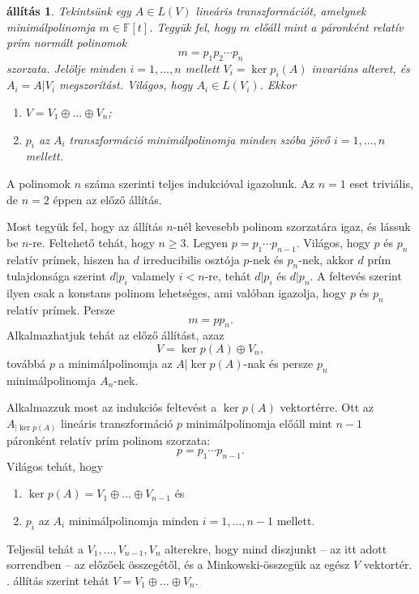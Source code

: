 \documentclass[9pt, a4paper, showtrims]{memoir}
\makeatletter
\let\Aref\relax
\renewenvironment{proof}[1][\proofname]
    {\par\pushQED{\qed}%
    \normalfont \topsep6\p@\@plus6\p@\relax
    \trivlist
    \item[\hskip\labelsep
        \itshape
    #1\@addpunct{:}]\ignorespaces}
    {\popQED\endtrivlist\@endpefalse}
\theoremstyle{plain}
\newtheorem{proposition}{állítás}[chapter]
\theoremstyle{remark}
\theoremstyle{definition}
\makeatother
\begin{document}
\begin{proposition}\label{pr:redukcio-primszorzat}
	Tekintsünk egy $A\in L\left( V \right)$ lineáris transzformációt,
	amelynek minimálpolinomja $m\in\mathbb{F}\left[ t \right]$.
	Tegyük fel, hogy $m$ előáll mint a páronként relatív prím
	normált polinomok
	\[
		m=p_1p_2\cdots p_n
	\]
	szorzata.
	Jelölje minden $i=1,\ldots,n$ mellett $V_i=\ker p_i\left( A \right)$
	invariáns alteret, és $A_i=A|V_i$ megszorítást.
	Világos, hogy $A_i\in L\left( V_i \right)$.
	Ekkor
	\begin{enumerate}
		\item $V=V_1\oplus\dots\oplus V_n$;
		\item $p_i$ az $A_i$ transzformáció minimálpolinomja minden szóba jövő
		      $i=1,\ldots,n$ mellett.\qedhere
	\end{enumerate}
\end{proposition}
\begin{proof}
	A polinomok $n$ száma szerinti teljes indukcióval igazolunk.
	Az $n=1$ eset triviális, de $n=2$ éppen az előző állítás.

	Most tegyük fel, hogy az állítás $n$-nél kevesebb polinom szorzatára igaz,
	és lássuk be $n$-re.
	Feltehető tehát, hogy $n\geq 3$.
	Legyen $p=p_1\cdots p_{n-1}$.
	Világos, hogy $p$ és $p_n$ relatív prímek, hiszen ha $d$ irreducibilis osztója
	$p$-nek és $p_n$-nek,
	akkor $d$ prím tulajdonsága szerint $d|p_i$ valamely $i<n$-re,
	tehát $d|p_i$ és $d|p_n$.
	A feltevés szerint ilyen csak a konstans polinom lehetséges,
	ami valóban igazolja, hogy $p$ és $p_n$ relatív prímek.
	Persze
	\[
		m=pp_n.
	\]
	Alkalmazhatjuk tehát az előző állítást, azaz
	\[
		V=\ker p\left( A \right)\oplus V_n,
	\]
	továbbá $p$ a minimálpolinomja az $A|\ker p\left( A \right)$-nak
	és persze $p_n$ minimálpolinomja $A_n$-nek.

	Alkalmazzuk most az indukciós feltevést a $\ker p\left( A \right)$ vektortérre.
	Ott az $A_{|\ker p\left( A \right)}$ lineáris transzformáció $p$ minimálpolinomja
	előáll mint $n-1$ páronként relatív prím polinom szorzata:
	\[
		p=p_1\cdots p_{n-1}.
	\]
	Világos tehát, hogy
	\begin{enumerate}
		\item
		      $\ker p\left( A \right)=V_1\oplus\dots\oplus V_{n-1}$ és
		\item $p_i$ az $A_i$ minimálpolinomja minden $i=1,\ldots,n-1$ mellett.
	\end{enumerate}
	Teljesül tehát a $V_1,\ldots,V_{n-1},V_n$ alterekre,
	hogy mind diszjunkt -- az itt adott sorrendben -- az előzőek összegétől,
	és a Minkowski-összegük az egész $V$ vektortér.
	\Aref{pr:direktosszegsorrend}. állítás szerint tehát $V=V_1\oplus\dots\oplus V_n$.
\end{proof}
\end{document}
